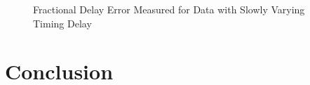 \documentclass{article}
\begin{document}
\begin{figure}[H]
	\centerline{}
	\caption{Fractional Delay Error Measured for Data with Slowly Varying Timing Delay}
	\label{fig::fractional_delay_error_timing_offset}
\end{figure}

\section{Conclusion}
	
\end{document}
